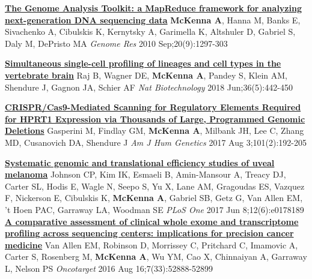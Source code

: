 \documentclass[9pt]{article}
\begin{document}
\noindent\href{https://www.ncbi.nlm.nih.gov/pubmed/20644199}{\bf  The Genome Analysis Toolkit: a MapReduce framework for analyzing next-generation DNA sequencing data}\vspace{-0.03in}
\newline\noindent \textbf{McKenna A}, Hanna M, Banks E, Sivachenko A, Cibulskis K, Kernytsky A, Garimella K, Altshuler D, Gabriel S, Daly M, DePristo MA
\newline\noindent\emph{ Genome Res} 2010 Sep;20(9):1297-303
\bigskip


\noindent\href{https://www.ncbi.nlm.nih.gov/pubmed/29608178}{\bf  Simultaneous single-cell profiling of lineages and cell types in the vertebrate brain}\vspace{-0.03in}
\newline\noindent Raj B, Wagner DE, \textbf{McKenna A}, Pandey S, Klein AM, Shendure J, Gagnon JA, Schier AF
\newline\noindent\emph{ Nat Biotechnology} 2018 Jun;36(5):442-450
\bigskip

\noindent\href{https://www.ncbi.nlm.nih.gov/pubmed/28712454}{\bf  CRISPR/Cas9-Mediated Scanning for Regulatory Elements Required for HPRT1 Expression via Thousands of Large, Programmed Genomic Deletions}\vspace{-0.03in}
\newline\noindent Gasperini M, Findlay GM, \textbf{McKenna A}, Milbank JH, Lee C, Zhang MD, Cusanovich DA, Shendure J
\newline\noindent\emph{ Am J Hum Genetics} 2017 Aug 3;101(2):192-205
\bigskip

\noindent\href{https://www.ncbi.nlm.nih.gov/pubmed/28594900}{\bf  Systematic genomic and translational efficiency studies of uveal melanoma}\vspace{-0.03in}
\newline\noindent Johnson CP, Kim IK, Esmaeli B, Amin-Mansour A, Treacy DJ, Carter SL, Hodis E,  Wagle N, Seepo S, Yu X, Lane AM, Gragoudas ES, Vazquez F, Nickerson E, Cibulskis  K, \textbf{McKenna A}, Gabriel SB, Getz G, Van Allen EM, 't Hoen PAC, Garraway LA, Woodman SE
\newline\noindent\emph{ PLoS One} 2017 Jun 8;12(6):e0178189
\bigskip
\noindent\href{https://www.ncbi.nlm.nih.gov/pubmed/27167109}{\bf  A comparative assessment of clinical whole exome and transcriptome profiling across sequencing centers: implications for precision cancer medicine}\vspace{-0.03in}
\newline\noindent Van Allen EM, Robinson D, Morrissey C, Pritchard C, Imamovic A, Carter S, Rosenberg M, \textbf{McKenna A}, Wu YM, Cao X, Chinnaiyan A, Garraway L, Nelson PS
\newline\noindent\emph{ Oncotarget} 2016  Aug 16;7(33):52888-52899
\bigskip
\end{document}
